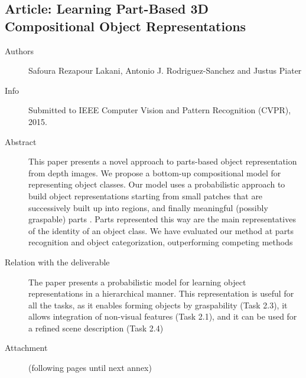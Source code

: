 \documentclass[a4paper,11pt,pdf]{pacmanreport}
\begin{document}
\subsection{Article: Learning Part-Based 3D Compositional Object Representations} \label{ann:cvpr}
\begin{description}
	\item[Authors] Safoura Rezapour Lakani, Antonio J. Rodriguez-Sanchez and Justus Piater
	\item[Info] Submitted to IEEE Computer Vision and Pattern Recognition (CVPR), 2015.
	\item[Abstract] This paper presents a novel approach to parts-based object 
representation from depth images. We propose a bottom-up compositional model for 
representing object classes. Our model uses a probabilistic approach to build 
object representations starting from small patches that are successively built 
up into regions, and finally meaningful (possibly graspable) parts . Parts 
represented this way are the main representatives of the identity of an object 
class. We have evaluated our method at parts recognition and object 
categorization, outperforming competing methods
	\item[Relation with the deliverable] The paper presents a probabilistic model for learning object representations in a hierarchical manner. This representation is useful for all the tasks, as it 
enables forming objects by graspability (Task 2.3), it allows integration of 
non-visual features (Task 2.1), and it can be used for a refined scene 
description (Task 2.4)
    \item[Attachment] (following pages until next annex)
\end{description}

\end{document}
